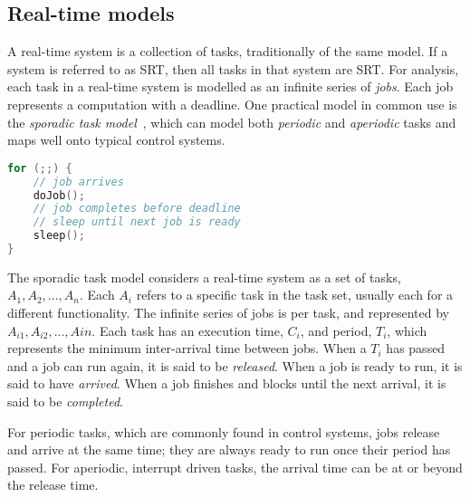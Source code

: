 \subsection{Real-time models}

A real-time system is a collection of tasks, traditionally of the same model. If a system is
referred to as \gls{SRT}, then all tasks in that system are \gls{SRT}. For analysis, each task in a
real-time system is modelled as an infinite series of \emph{jobs}. Each job represents a computation
with a deadline. 
One practical model in common use is the \emph{sporadic task model}~\citep{Sprunt_SL_89a}, which can
model both \emph{periodic} and \emph{aperiodic} tasks and maps well onto typical control systems. 

\begin{lstlisting}[frame=single,language=c,caption=Example of a basic sporadic real-time task.,label=list:sporadic,float=htpb]
for (;;) {
	// job arrives
	doJob();
	// job completes before deadline
    // sleep until next job is ready
    sleep();
}
\end{lstlisting}


The sporadic task model considers a real-time system as a set of tasks, $A_{1},A_{2},...,A_{n}$.
Each $A_{i}$ refers to a specific task in the task set, usually each for a different functionality.
The infinite series of jobs is per task, and represented by $A_{i1},A_{i2},...,A{in}$. Each task has
an execution time, $C_{i}$, and period, $T_{i}$, which represents the minimum inter-arrival time
between jobs. When a $T_{i}$ has passed and a job can run again, it is said to be \emph{released}.
When a job is ready to run, it is said to have \emph{arrived}. When a job finishes and blocks until
the next arrival, it is said to be \emph{completed}. 

For periodic tasks, which are commonly found in control systems, jobs release and arrive at the same
time; they are always ready to run once their period has passed. For aperiodic, \ie interrupt driven
tasks, the arrival time can be at or beyond the release time. 

